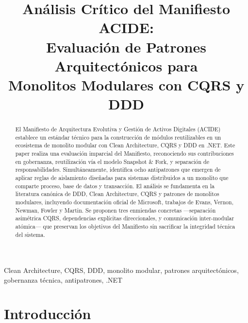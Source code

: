\documentclass[conference]{IEEEtran}
\begin{document}
\title{An\'alisis Cr\'itico del Manifiesto ACIDE:\\Evaluaci\'on de Patrones Arquitect\'onicos para\\Monolitos Modulares con CQRS y DDD}

\author{
}

\maketitle

\begin{abstract}
El Manifiesto de Arquitectura Evolutiva y Gesti\'on de Activos Digitales (ACIDE) establece un est\'andar t\'ecnico para la construcci\'on de m\'odulos reutilizables en un ecosistema de monolito modular con Clean Architecture, CQRS y DDD en .NET. Este paper realiza una evaluaci\'on imparcial del Manifiesto, reconociendo sus contribuciones en gobernanza, reutilizaci\'on v\'ia el modelo Snapshot \& Fork, y separaci\'on de responsabilidades. Simult\'aneamente, identifica ocho antipatrones que emergen de aplicar reglas de aislamiento dise\~nadas para sistemas distribuidos a un monolito que comparte proceso, base de datos y transacci\'on. El an\'alisis se fundamenta en la literatura can\'onica de DDD, Clean Architecture, CQRS y patrones de monolitos modulares, incluyendo documentaci\'on oficial de Microsoft, trabajos de Evans, Vernon, Newman, Fowler y Martin. Se proponen tres enmiendas concretas ---separaci\'on asim\'etrica CQRS, dependencias expl\'icitas direccionales, y comunicaci\'on inter-modular at\'omica--- que preservan los objetivos del Manifiesto sin sacrificar la integridad t\'ecnica del sistema.
\end{abstract}

\begin{IEEEkeywords}
Clean Architecture, CQRS, DDD, monolito modular, patrones arquitect\'onicos, gobernanza t\'ecnica, antipatrones, .NET
\end{IEEEkeywords}


\section{Introducci\'on}
\end{document}
